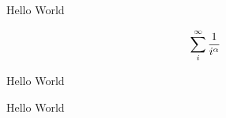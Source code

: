 

\hugesans

\begingroup\color{white}
\vfill
\centerline{Hello World}
$$\sum_i^\infty {1 \over i^\alpha}$$
\centerline{Hello World}
\vfill
\eject

\vfill
\centerline{\begingroup\color{cgemblue} \hugebf Hello World\endgroup}
\endgroup %
\bye

